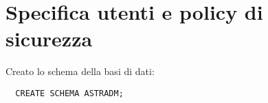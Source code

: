 \section{Specifica utenti e policy di sicurezza}
Creato lo schema della basi di dati:
\begin{verbatim}
  CREATE SCHEMA ASTRADM;
\end{verbatim}

